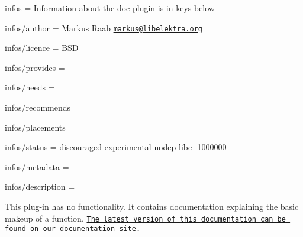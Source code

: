 
\begin{DoxyItemize}
\item infos = Information about the doc plugin is in keys below
\item infos/author = Markus Raab \href{mailto:markus@libelektra.org}{\tt markus@libelektra.\+org}
\item infos/licence = B\+S\+D
\item infos/provides =
\item infos/needs =
\item infos/recommends =
\item infos/placements =
\item infos/status = discouraged experimental nodep libc -\/1000000
\item infos/metadata =
\item infos/description =
\end{DoxyItemize}

This plug-\/in has no functionality. It contains documentation explaining the basic makeup of a function. \href{http://doc.libelektra.org/api/latest/html/group__plugin.html}{\tt The latest version of this documentation can be found on our documentation site.} 